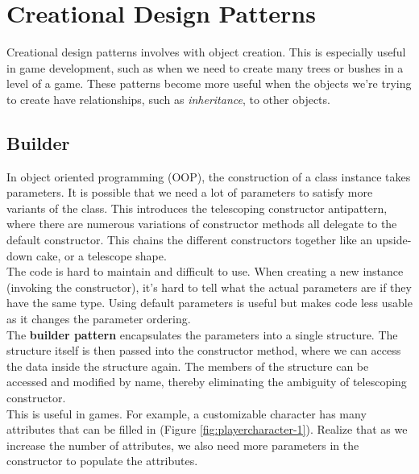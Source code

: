\section{Creational Design Patterns}

\iftwocolumns
\begin{multicols}{2}
\fi

Creational design patterns involves with object creation.\cite{sm-creationaldp} This is especially useful in game development, such as when we need to create many trees or bushes in a level of a game. These patterns become more useful when the objects we're trying to create have relationships, such as \textit{inheritance}, to other objects.

\subsection{Builder}

In object oriented programming (OOP), the construction of a class instance takes parameters. It is possible that we need a lot of parameters to satisfy more variants of the class. This introduces the telescoping constructor antipattern\cite{telescopingconstructor}, where there are numerous variations of constructor methods all delegate to the default constructor. This chains the different constructors together like an upside-down cake, or a telescope shape.\bs
\\
The code is hard to maintain and difficult to use. When creating a new instance (invoking the constructor), it's hard to tell what the actual parameters are if they have the same type. Using default parameters is useful but makes code less usable as it changes the parameter ordering.\bs
\\
The \textbf{builder pattern} encapsulates the parameters into a single structure. The structure itself is then passed into the constructor method, where we can access the data inside the structure again. The members of the structure can be accessed and modified by name, thereby eliminating the ambiguity of telescoping constructor.\bs
\\
This is useful in games. For example, a customizable character has many attributes that can be filled in (Figure \ref{fig:playercharacter-1}). Realize that as we increase the number of attributes, we also need more parameters in the constructor to populate the attributes.

\begin{figure}[H]
	\centering


\end{figure}
\end{multicols}
